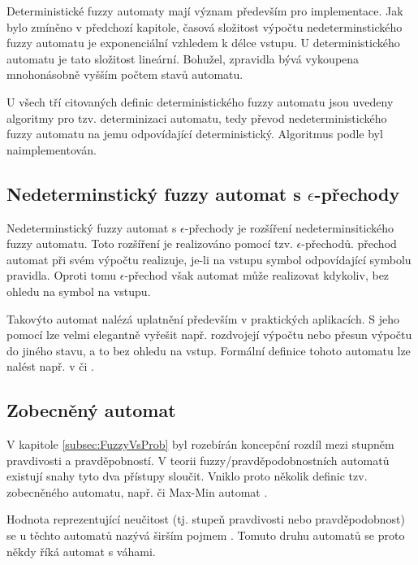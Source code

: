 \documentclass[a4paper,10pt]{article}
\begin{document}
Deterministické fuzzy automaty mají význam především pro implementace. Jak bylo zmíněno v předchozí kapitole,  časová složitost výpočtu nedeterminstického fuzzy automatu je exponenciální vzhledem k délce vstupu. U deterministického automatu je tato složitost lineární. Bohužel, zpravidla bývá vykoupena mnohonásobně vyšším počtem stavů automatu.

U všech tří citovaných definic deterministického fuzzy automatu jsou uvedeny algoritmy pro tzv. determinizaci automatu, tedy převod nedeterministického fuzzy automatu na jemu odpovídající deterministický. Algoritmus podle \cite{GonGar-FuzzLangInfRanAccGuzzAutPumLemDetProc} byl naimplementován.

\subsection{Nedeterminstický fuzzy automat s $\epsilon$-přechody}
Nedeterminstický fuzzy automat s $\epsilon$-přechody je rozšíření nedeterminsitického fuzzy automatu. Toto rozšíření je realizováno pomocí tzv. $\epsilon$-přechodů.  přechod automat při svém výpočtu realizuje, je-li na vstupu symbol odpovídající symbolu pravidla. Oproti tomu $\epsilon$-přechod však automat může realizovat kdykoliv, bez ohledu na symbol na vstupu.

Takovýto automat nalézá uplatnění především v praktických aplikacích. S jeho pomocí lze velmi elegantně vyřešit např. rozdvojejí výpočtu nebo přesun výpočtu do jiného stavu, a to bez ohledu na vstup. Formální definice tohoto automatu lze nalést např. v \cite{SnaKepAbrHas-AproxStriMatchFuzzAut} či \cite{LiLiLi-RelAmoSevTypFuzAut}.

\subsection{Zobecněný automat}
V kapitole \ref{subsec:FuzzyVsProb} byl rozebírán koncepční rozdíl mezi stupněm pravdivosti a pravděpobností. V teorii fuzzy/pravděpodobnostních automatů existují snahy tyto dva přístupy sloučit. Vniklo proto několik definic tzv. zobecněného automatu, např. \cite{DooKre-NewDirFuzzAut} či Max-Min automat \cite{San-MaxAut}. 

Hodnota reprezentující neučitost (tj. stupeň pravdivosti nebo pravděpodobnost) se u těchto automatů nazývá širším pojmem . Tomuto druhu automatů se proto někdy říká automat s váhami.
\end{document}
